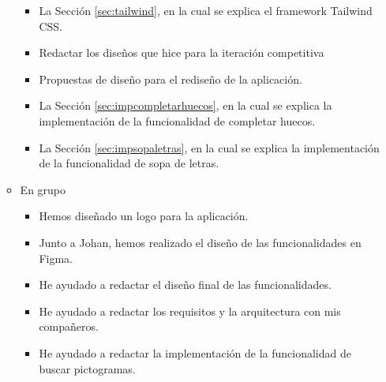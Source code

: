 \begin{itemize}
\begin{itemize}
                    \begin{itemize}
                        \item La Sección \ref{sec:tailwind}, en la cual se explica el framework Tailwind CSS.
                        \item Redactar los diseños que hice para la iteración competitiva
                        \item Propuestas de diseño para el rediseño de la aplicación.
                        \item La Sección \ref{sec:impcompletarhuecos}, en la cual se explica la implementación de la funcionalidad de completar huecos.
                        \item La Sección \ref{sec:impsopaletras}, en la cual se explica la implementación de la funcionalidad de sopa de letras.
                    \end{itemize}
              \item En grupo
                    \begin{itemize}
                        \item Hemos diseñado un logo para la aplicación.
                        \item Junto a Johan, hemos realizado el diseño de las funcionalidades en Figma.
                        \item He ayudado a redactar el diseño final de las funcionalidades.
                        \item He ayudado a redactar los requisitos y la arquitectura con mis compañeros.
                        \item He ayudado a redactar la implementación de la funcionalidad de buscar pictogramas.
                    \end{itemize}
          \end{itemize}
\end{itemize}

